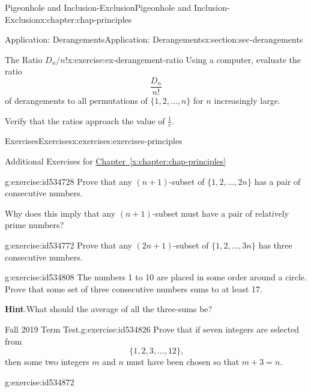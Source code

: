 \documentclass[oneside,10pt,]{book}
\newcommand{\blocktitlefont}{\relax}
\newcommand{\xreffont}{\relax}
\numberwithin{equation}{section}
\begin{document}
\begin{chapterptx}{Pigeonhole and Inclusion-Exclusion}{}{Pigeonhole and Inclusion-Exclusion}{}{}{x:chapter:chap-principles}
\begin{sectionptx}{Application: Derangements}{}{Application: Derangements}{}{}{x:section:sec-derangements}
\begin{inlineexercise}{The Ratio \(D_n/n!\)}{x:exercise:ex-derangement-ratio}
Using a computer, evaluate the ratio%
\begin{equation*}
\frac{D_n}{n!}
\end{equation*}
of derangements to all permutations of \(\{1,2,\ldots,n\}\) for \(n\) increasingly large.%
\par
Verify that the ratios approach the value of \(\frac{1}{e}\).%
\end{inlineexercise}%
\end{sectionptx}
%
%
\typeout{************************************************}
\typeout{************************************************}
%
\begin{exercises-section}{Exercises}{}{Exercises}{}{}{x:exercises:exercises-principles}
\begin{introduction}{}%
Additional Exercises for \hyperref[x:chapter:chap-principles]{Chapter~{\xreffont\ref{x:chapter:chap-principles}}}%
\end{introduction}%
\begin{divisionexercise}{1}{}{}{g:exercise:id534728}%
Prove that any \((n+1)\)-subset of \(\{1,2,\ldots,2n\}\) has a pair of consecutive numbers.%
\par
Why does this imply that any \((n+1)\)-subset must have a pair of relatively prime numbers?%
\end{divisionexercise}%
\begin{divisionexercise}{2}{}{}{g:exercise:id534772}%
Prove that any \((2n+1)\)-subset of \(\{1,2,\ldots,3n\}\) has three consecutive numbers.%
\end{divisionexercise}%
\begin{divisionexercise}{3}{}{}{g:exercise:id534808}%
The numbers 1 to 10 are placed in some order around a circle. Prove that some set of three consecutive numbers sums to at least 17.%
\par\smallskip%
\noindent\textbf{\blocktitlefont Hint}.\hypertarget{g:hint:id534802}{}\quad{}What should the average of all the three-sums be?%
\end{divisionexercise}%
\begin{divisionexercise}{4}{Fall 2019 Term Test.}{}{g:exercise:id534826}%
Prove that if seven integers are selected from%
\begin{equation*}
\{1,2,3,\ldots,12\}\text{,}
\end{equation*}
then some two integers \(m\) and \(n\) must have been chosen so that \(m + 3 = n\).%
\end{divisionexercise}%
\begin{divisionexercise}{5}{}{}{g:exercise:id534872}%

\end{divisionexercise}
\end{exercises-section}
\end{chapterptx}
\end{document}
